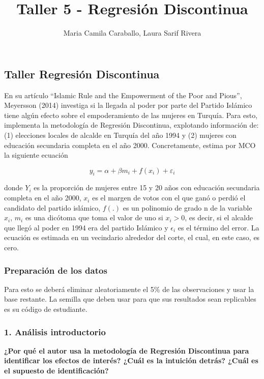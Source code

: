 \documentclass[
]{article}
\title{Taller 5 - Regresión Discontinua}
\author{Maria Camila Caraballo, Laura Sarif Rivera}
\date{}
\begin{document}
\maketitle

\subsection{Taller Regresión
Discontinua}\label{taller-regresiuxf3n-discontinua}

En su artículo ``Islamic Rule and the Empowerment of the Poor and
Pious'', Meyersson (2014) investiga si la llegada al poder por parte del
Partido Islámico tiene algún efecto sobre el empoderamiento de las
mujeres en Turquía. Para esto, implementa la metodología de Regresión
Discontinua, explotando información de: (1) elecciones locales de
alcalde en Turquía del año 1994 y (2) mujeres con educación secundaria
completa en el año 2000. Concretamente, estima por MCO la siguiente
ecuación

\[y_i=α+βm_i+f(x_i )+ε_i\]

donde \(Y_i\) es la proporción de mujeres entre 15 y 20 años con
educación secundaria completa en el año 2000, \(x_i\) es el margen de
votos con el que ganó o perdió el candidato del partido islámico,
\(f(.)\) es un polinomio de grado n de la variable \(x_i\), \(m_i\) es
una dicótoma que toma el valor de uno si \(x_i > 0\), es decir, si el
alcalde que llegó al poder en 1994 era del partido Islámico y
\(\epsilon_i\) es el término del error. La ecuación es estimada en un
vecindario alrededor del corte, el cual, en este caso, es cero.

\subsubsection{Preparación de los
datos}\label{preparaciuxf3n-de-los-datos}

Para esto se deberá eliminar aleatoriamente el 5\% de las observaciones
y usar la base restante. La semilla que deben usar para que sus
resultados sean replicables es su código de estudiante.

\subsubsection{1. Análisis
introductorio}\label{anuxe1lisis-introductorio}

\textbf{¿Por qué el autor usa la metodología de Regresión Discontinua
para identificar los efectos de interés? ¿Cuál es la intuición detrás?
¿Cuál es el supuesto de identificación?}
\end{document}
